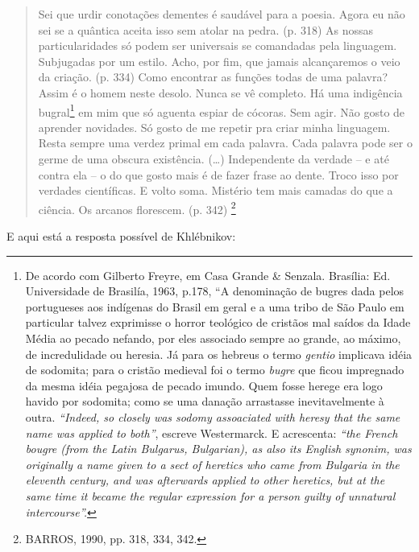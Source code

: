\begin{quote}
Sei que urdir conotações dementes é saudável para a poesia. Agora eu não
sei se a quântica aceita isso sem atolar na pedra. (p. 318) As nossas
particularidades só podem ser universais se comandadas pela linguagem.
Subjugadas por um estilo. Acho, por fim, que jamais alcançaremos o veio
da criação. (p. 334) Como encontrar as funções todas de uma palavra?
Assim é o homem neste desolo. Nunca se vê completo. Há uma indigência
bugral\footnote{De acordo com Gilberto Freyre, em Casa Grande \&
  Senzala. Brasília: Ed. Universidade de Brasilía, 1963, p.178, ``A
  denominação de bugres dada pelos portugueses aos indígenas do Brasil
  em geral e a uma tribo de São Paulo em particular talvez exprimisse o
  horror teológico de cristãos mal saídos da Idade Média ao pecado
  nefando, por eles associado sempre ao grande, ao máximo, de
  incredulidade ou heresia. Já para os hebreus o termo \emph{gentio}
  implicava idéia de sodomita; para o cristão medieval foi o termo
  \emph{bugre} que ficou impregnado da mesma idéia pegajosa de pecado
  imundo. Quem fosse herege era logo havido por sodomita; como se uma
  danação arrastasse inevitavelmente à outra. \emph{``Indeed, so closely
  was sodomy assoaciated with heresy that the same name was
  applied to both''}, escreve Westermarck. E acrescenta: \emph{``the
  French \emph{bougre} (from the Latin \emph{Bulgarus}, \emph{Bulgarian}), as also its English
  synonim, was originally a name given to a sect of heretics who came from
  Bulgaria in the eleventh century, and was afterwards applied to other
  heretics, but at the same time it became the regular expression for
  a person guilty of unnatural intercourse''.}} em mim que só aguenta
espiar de cócoras. Sem agir. Não gosto de aprender novidades. Só gosto
de me repetir pra criar minha linguagem. Resta sempre uma verdez primal
em cada palavra. Cada palavra pode ser o germe de uma obscura
existência. (\ldots{}) Independente da verdade -- e até contra ela -- o do
que gosto mais é de fazer frase ao dente. Troco isso por verdades
científicas. E volto soma. Mistério tem mais camadas do que a ciência.
Os arcanos florescem. (p. 342) \footnote{BARROS, 1990, pp. 318, 334,
  342.}
\end{quote}

E aqui está a resposta possível de Khlébnikov:


